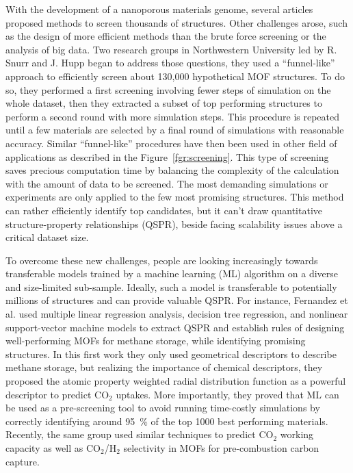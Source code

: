 \documentclass[main.tex]{subfiles}
\begin{document}
With the development of a nanoporous materials genome, several articles proposed methods to screen thousands of structures. Other challenges arose, such as the design of more efficient methods than the brute force screening or the analysis of big data. Two research groups in Northwestern University led by R. Snurr and J. Hupp began to address those questions, they used a ``funnel-like'' approach to efficiently screen about 130,000 hypothetical MOF structures.\cite{Wilmer_2012} To do so, they performed a first screening involving fewer steps of simulation on the whole dataset, then they extracted a subset of top performing structures to perform a second round with more simulation steps. This procedure is repeated until a few materials are selected by a final round of simulations with reasonable accuracy.
Similar ``funnel-like'' procedures have then been used in other field of applications as described in the Figure~\ref{fgr:screening}. This type of screening saves precious computation time by balancing the complexity of the calculation with the amount of data to be screened. The most demanding simulations or experiments are only applied to the few most promising structures.
This method can rather efficiently identify top candidates, but it can't draw quantitative structure-property relationships (QSPR), beside facing scalability issues above a critical dataset size.

To overcome these new challenges, people are looking increasingly towards transferable models trained by a machine learning (ML) algorithm on a diverse and size-limited sub-sample. Ideally, such a model is transferable to potentially millions of structures and can provide valuable QSPR. For instance, Fernandez et al.\cite{Fernandez_2013} used multiple linear regression analysis, decision tree regression, and nonlinear support-vector
machine models to extract QSPR and establish rules of designing well-performing MOFs for methane storage, while identifying promising structures. In this first work they only used geometrical descriptors to describe methane storage,\cite{Fernandez_2013} but realizing the importance of chemical descriptors, they proposed the atomic property weighted radial distribution function as a powerful descriptor to predict CO$_2$ uptakes.\cite{Fernandez_2013_rdf}
More importantly, they proved that ML can be used as a pre-screening tool to avoid running time-costly simulations by correctly identifying around \SI{95}{\percent} of the top 1000 best performing materials. Recently, the same group used similar techniques to predict CO$_2$ working capacity as well as CO$_2$/H$_2$ selectivity in MOFs for pre-combustion carbon capture.\cite{Dureckova_2019}
\end{document}
